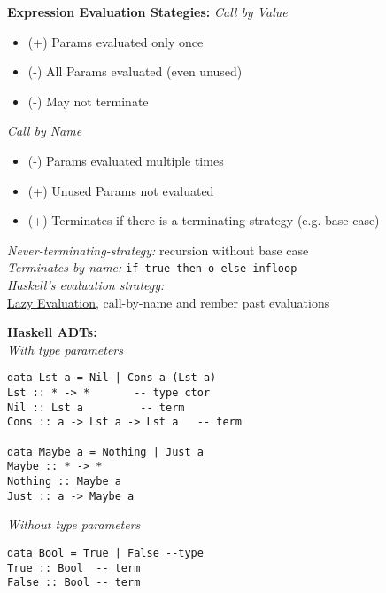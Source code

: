 \begin{breakbox}
\textbf{Expression Evaluation Stategies:}
\emph{Call by Value}
\begin{itemize}
	\setlength{\itemsep}{0pt}
    \setlength{\parskip}{0pt}
    \setlength{\parsep}{0pt}
    \setlength{\itemindent}{-0.15in}
	\item (+) Params evaluated only once
	\item (-) All Params evaluated (even unused)
	\item (-) May not terminate
\end{itemize}
\emph{Call by Name}
\begin{itemize}
	\setlength{\itemsep}{0pt}
    \setlength{\parskip}{0pt}
    \setlength{\parsep}{0pt}
    \setlength{\itemindent}{-0.15in}
	\item (-) Params evaluated multiple times
	\item (+) Unused Params not evaluated
	\item (+) Terminates if there is a terminating strategy (e.g. base case)
\end{itemize}
\emph{Never-terminating-strategy:} recursion without base case \\
\emph{Terminates-by-name:} \texttt{if true then o else infloop}\\
\emph{Haskell's evaluation strategy:}\\\underline{Lazy Evaluation}, call-by-name and rember past evaluations
\end{breakbox}

\begin{breakbox}
\textbf{Haskell ADTs:}\\
\emph{With type parameters}
\vspace{-5mm}
\begin{verbatim}
data Lst a = Nil | Cons a (Lst a)
Lst :: * -> * 		-- type ctor
Nil :: Lst a 		 -- term
Cons :: a -> Lst a -> Lst a   -- term

data Maybe a = Nothing | Just a
Maybe :: * -> *
Nothing :: Maybe a
Just :: a -> Maybe a
\end{verbatim}
\emph{Without type parameters}
\vspace{-5mm}
\begin{verbatim}
data Bool = True | False --type
True :: Bool  -- term
False :: Bool -- term
\end{verbatim}
\end{breakbox}

